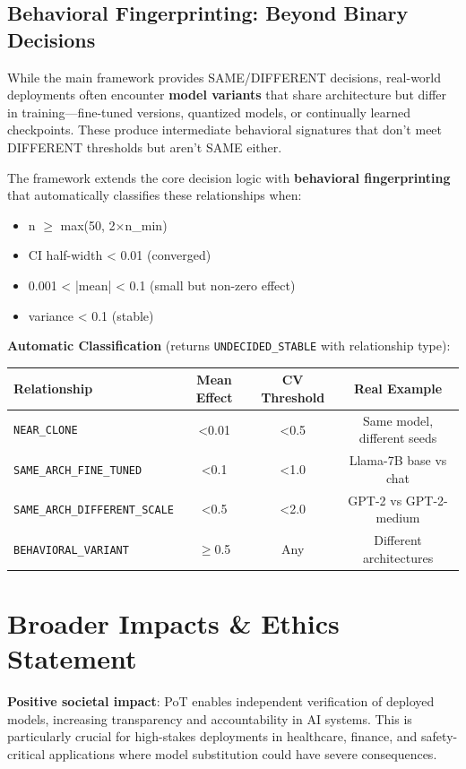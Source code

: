 \documentclass{article}
\begin{document}
\subsection{Behavioral Fingerprinting: Beyond Binary Decisions}
\label{sec:behavioral-fingerprinting}

While the main framework provides SAME/DIFFERENT decisions, real-world deployments often encounter \textbf{model variants} that share architecture but differ in training---fine-tuned versions, quantized models, or continually learned checkpoints. These produce intermediate behavioral signatures that don't meet DIFFERENT thresholds but aren't SAME either.

The framework extends the core decision logic with \textbf{behavioral fingerprinting} that automatically classifies these relationships when:
\begin{itemize}
\item n $\geq$ max(50, 2×n\_min)
\item CI half-width < 0.01 (converged)
\item 0.001 < |mean| < 0.1 (small but non-zero effect)
\item variance < 0.1 (stable)
\end{itemize}

\textbf{Automatic Classification} (returns \texttt{UNDECIDED\_STABLE} with relationship type):

\begin{table}[h]
\centering
\begin{tabular}{lccc}
\toprule
Relationship & Mean Effect & CV Threshold & Real Example \\
\midrule
\texttt{NEAR\_CLONE} & <0.01 & <0.5 & Same model, different seeds \\
\texttt{SAME\_ARCH\_FINE\_TUNED} & <0.1 & <1.0 & Llama-7B base vs chat \\
\texttt{SAME\_ARCH\_DIFFERENT\_SCALE} & <0.5 & <2.0 & GPT-2 vs GPT-2-medium \\
\texttt{BEHAVIORAL\_VARIANT} & $\geq$0.5 & Any & Different architectures \\
\bottomrule
\end{tabular}
\end{table}

\section{Broader Impacts \& Ethics Statement}

\textbf{Positive societal impact}: PoT enables independent verification of deployed models, increasing transparency and accountability in AI systems. This is particularly crucial for high-stakes deployments in healthcare, finance, and safety-critical applications where model substitution could have severe consequences.
\end{document}
